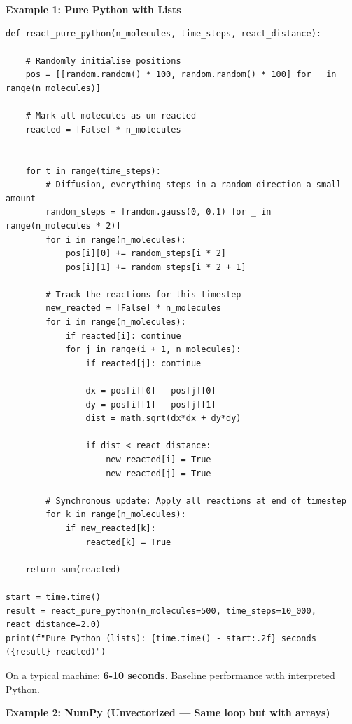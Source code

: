\newpage 
\noindent \textbf{Example 1: Pure Python with Lists}
\begin{lstlisting}
def react_pure_python(n_molecules, time_steps, react_distance):

	# Randomly initialise positions
    pos = [[random.random() * 100, random.random() * 100] for _ in range(n_molecules)]
	
	# Mark all molecules as un-reacted
    reacted = [False] * n_molecules

	
    for t in range(time_steps):
        # Diffusion, everything steps in a random direction a small amount
        random_steps = [random.gauss(0, 0.1) for _ in range(n_molecules * 2)]
        for i in range(n_molecules):
            pos[i][0] += random_steps[i * 2]
            pos[i][1] += random_steps[i * 2 + 1]

        # Track the reactions for this timestep
        new_reacted = [False] * n_molecules
        for i in range(n_molecules):
            if reacted[i]: continue
            for j in range(i + 1, n_molecules):
                if reacted[j]: continue
                
                dx = pos[i][0] - pos[j][0]
                dy = pos[i][1] - pos[j][1]
                dist = math.sqrt(dx*dx + dy*dy)
                
                if dist < react_distance:
                    new_reacted[i] = True
                    new_reacted[j] = True

        # Synchronous update: Apply all reactions at end of timestep
        for k in range(n_molecules):
            if new_reacted[k]:
                reacted[k] = True

    return sum(reacted)

start = time.time()
result = react_pure_python(n_molecules=500, time_steps=10_000, react_distance=2.0)
print(f"Pure Python (lists): {time.time() - start:.2f} seconds ({result} reacted)")
\end{lstlisting}

\noindent On a typical machine: \textbf{6-10 seconds}. Baseline performance with interpreted Python.

\newpage 
\noindent \textbf{Example 2: NumPy (Unvectorized --- Same loop but with  arrays)}

